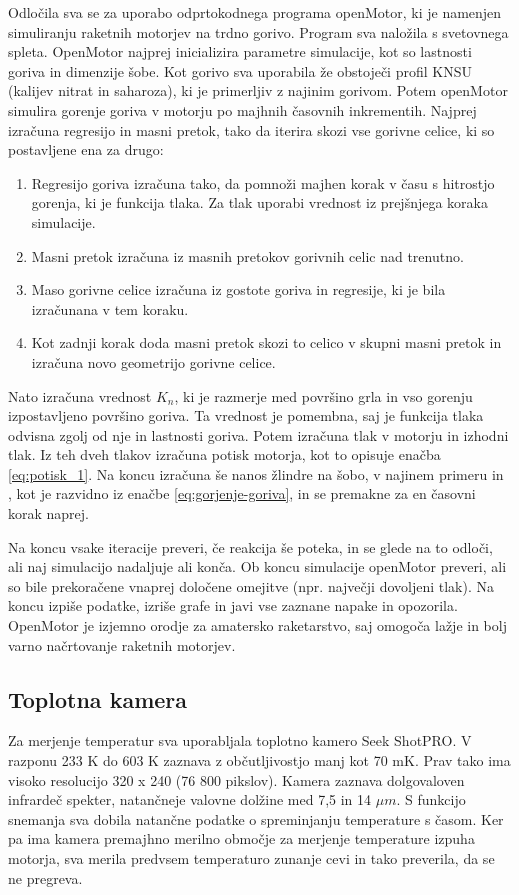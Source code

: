 \documentclass[titlepage, a4paper, twoside, final, 12pt]{article}
\begin{document}
			Odločila sva se za uporabo odprtokodnega programa openMotor, ki je namenjen simuliranju raketnih motorjev na trdno gorivo.
			Program sva naložila s svetovnega spleta.\cite{openMotor}
			OpenMotor najprej inicializira parametre simulacije, kot so lastnosti goriva in dimenzije šobe. Kot gorivo sva uporabila že obstoječi profil KNSU (kalijev nitrat in saharoza), ki je primerljiv z najinim gorivom.
			Potem openMotor simulira gorenje goriva v motorju po majhnih časovnih inkrementih. Najprej izračuna regresijo in masni pretok, tako da iterira skozi vse gorivne celice, ki so postavljene ena za drugo:
			\cite{openMotor}
			\begin{enumerate}
				\item Regresijo goriva izračuna tako, da pomnoži majhen korak v času s hitrostjo gorenja, ki je funkcija tlaka.
					Za tlak uporabi vrednost iz prejšnjega koraka simulacije.
				\item Masni pretok izračuna iz masnih pretokov gorivnih celic nad trenutno.
				\item Maso gorivne celice izračuna iz gostote goriva in regresije, ki je bila izračunana v tem koraku.
				\item Kot zadnji korak doda masni pretok skozi to celico v skupni masni pretok in izračuna novo geometrijo gorivne celice.
			\end{enumerate}

			Nato izračuna vrednost $K_n$, ki je razmerje med površino grla in vso gorenju izpostavljeno površino goriva. Ta vrednost je pomembna,
			saj je funkcija tlaka odvisna zgolj od nje in lastnosti goriva.\cite{openMotor} Potem izračuna tlak v motorju in izhodni tlak.
			Iz teh dveh tlakov izračuna potisk motorja, kot to opisuje enačba \ref{eq:potisk_1}.
			Na koncu izračuna še nanos žlindre na šobo, v najinem primeru  in , kot je razvidno iz enačbe \ref{eq:gorjenje-goriva}, in se premakne za en časovni korak naprej. 

			Na koncu vsake iteracije preveri, če reakcija še poteka, in se glede na to odloči, ali naj simulacijo nadaljuje ali konča.
			Ob koncu simulacije openMotor preveri, ali so bile prekoračene vnaprej določene omejitve (npr. največji dovoljeni tlak).
			Na koncu izpiše podatke, izriše grafe in javi vse zaznane napake in opozorila.
			OpenMotor je izjemno orodje za amatersko raketarstvo, saj omogoča lažje in bolj varno načrtovanje raketnih motorjev.

			\subsection{Toplotna kamera}
			Za merjenje temperatur sva uporabljala toplotno kamero Seek ShotPRO. V razponu 233 K do 603 K zaznava z občutljivostjo manj kot 70 mK.
			Prav tako ima visoko resolucijo 320 x 240 (76 800 pikslov). Kamera zaznava dolgovaloven infrardeč spekter, natančneje valovne dolžine med 7,5 in 14 $\mu m$.\cite{seekshotpro_specsheet}
			S funkcijo snemanja sva dobila natančne podatke o spreminjanju temperature s časom. Ker pa ima kamera premajhno merilno območje
			za merjenje temperature izpuha motorja, sva merila predvsem temperaturo zunanje cevi in tako preverila, da se ne pregreva.
\end{document}
